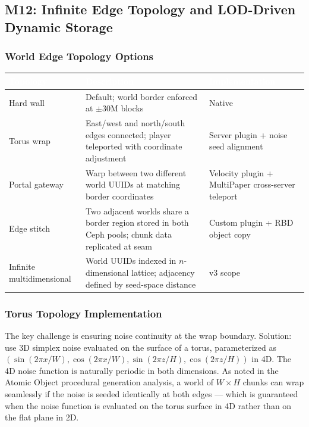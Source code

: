 \documentclass[11pt,letterpaper]{article}
\newcommand{\tableheader}[1]{\textbf{\sffamily\textcolor{white}{#1}}}
\begin{document}
\subsection{M12: Infinite Edge Topology and LOD-Driven Dynamic Storage}

\subsubsection{World Edge Topology Options}

\begin{center}
\begin{tabularx}{\textwidth}{L{3.5cm}XL{3cm}}
\toprule
{}
\tableheader{Topology} & \tableheader{Description} & \tableheader{Implementation} \\
\midrule
Hard wall & Default; world border enforced at $\pm$30M blocks & Native \\
Torus wrap & East/west and north/south edges connected; player teleported with coordinate adjustment & Server plugin + noise seed alignment \\
Portal gateway & Warp between two different world UUIDs at matching border coordinates & Velocity plugin + MultiPaper cross-server teleport \\
Edge stitch & Two adjacent worlds share a border region stored in both Ceph pools; chunk data replicated at seam & Custom plugin + RBD object copy \\
Infinite multidimensional & World UUIDs indexed in $n$-dimensional lattice; adjacency defined by seed-space distance & v3 scope \\
\bottomrule
\end{tabularx}
\end{center}

\subsubsection{Torus Topology Implementation}

The key challenge is ensuring noise continuity at the wrap boundary. Solution: use 3D simplex noise evaluated on the surface of a torus, parameterized as $(\sin(2\pi x/W), \cos(2\pi x/W), \sin(2\pi z/H), \cos(2\pi z/H))$ in 4D. The 4D noise function is naturally periodic in both dimensions. As noted in the Atomic Object procedural generation analysis, a world of $W \times H$ chunks can wrap seamlessly if the noise is seeded identically at both edges --- which is guaranteed when the noise function is evaluated on the torus surface in 4D rather than on the flat plane in 2D.
\end{document}
